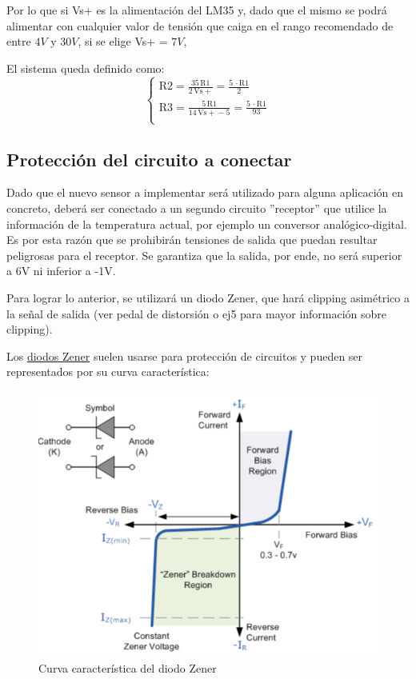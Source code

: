 \documentclass[../../main.tex]{subfiles}
\begin{document}
\begin{itemize}
 	
 	Por lo que si Vs+ es la alimentación del LM35 y, dado que el mismo se podrá alimentar con cualquier valor de tensión que caiga en el rango recomendado de entre $4V$ y $30V$, si se elige Vs+ = $7V$, \par

 El sistema queda definido como:
 		 \begin{equation}
  	   \left\{
	  	    \begin{array}{ll}
		 					\mathrm{R2} = \frac{35\, \mathrm{R1}}{2\, \mathrm{Vs+}} = \frac{5\, \cdot\mathrm{R1}}{2}\\
			 				\mathrm{R3} = \frac{5\, \mathrm{R1}}{14\, \mathrm{Vs+} - 5} = \frac{5\, \cdot\mathrm{R1}}{93}\\
	     	 \end{array}
	     	\right.
 	\end{equation}

\end{itemize}
\subsection{Protección del circuito a conectar}
\label{Protect}
Dado que el nuevo sensor a implementar será utilizado para alguna aplicación en concreto, deberá ser conectado a un segundo circuito ''receptor'' que utilice la información de la temperatura actual, por ejemplo un conversor analógico-digital. Es por esta razón que se prohibirán tensiones de salida que puedan resultar peligrosas para el receptor. Se garantiza que la salida, por ende, no será superior a 6V ni inferior a -1V. \par
Para lograr lo anterior, se utilizará un diodo Zener, que hará clipping asimétrico a la señal de salida (ver pedal de distorsión o ej5 para mayor información sobre clipping).\par
Los \underline{diodos Zener} suelen usarse para protección de circuitos y pueden ser representados por su curva característica:

\begin{figure}[H]	%
	\centering
	\includegraphics[scale=0.5]{imagenes/zener_diode_curva.png}
	\caption{Curva característica del diodo Zener}
	\label{fig:ej6_zener_diode_curva}
\end{figure}
\end{document}
